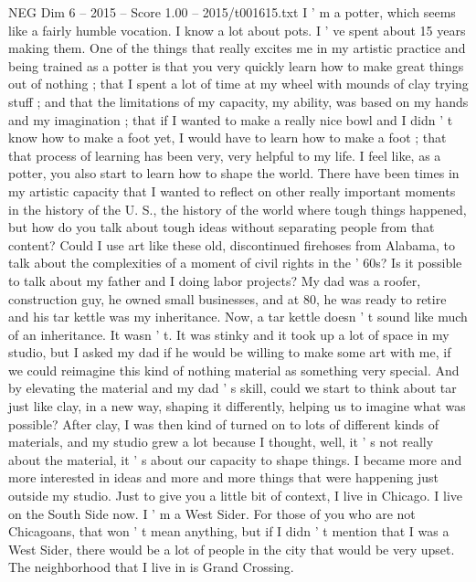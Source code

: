 \begin{textsample}{NEG Dim 6 – 2015 – Score 1.00 – 2015/t001615.txt}  \label{ex:f6_neg_029}
I ' m a potter, which seems like a fairly humble vocation.
I know a lot about pots.
I ' ve spent about 15 years making them.
One of the things that really excites me in my artistic practice and being trained as a potter is that you very quickly learn how to make great things out of nothing ; that I spent a lot of time at my wheel with mounds of clay trying stuff ; and that the limitations of my capacity, my ability, was based on my hands and my imagination ; that if I wanted to make a really nice bowl and I didn ' t know how to make a foot yet, I would have to learn how to make a foot ; that that process of learning has been very, very helpful to my life.
I feel like, as a potter, you also start to learn how to shape the world.
There have been times in my artistic capacity that I wanted to reflect on other really important moments in the history of the U.
S., the history of the world where tough things happened, but how do you talk about tough ideas without separating people from that content?
Could I use art like these old, discontinued firehoses from Alabama, to talk about the complexities of a moment of civil rights in the ' 60s?
Is it possible to talk about my father and I doing labor projects?
My dad was a roofer, construction guy, he owned small businesses, and at 80, he was ready to retire and his tar kettle was my inheritance.
Now, a tar kettle doesn ' t sound like much of an inheritance.
It wasn ' t.
It was stinky and it took up a lot of space in my studio, but I asked my dad if he would be willing to make some art with me, if we could reimagine this kind of nothing material as something very special.
And by elevating the material and my dad ' s skill, could we start to think about tar just like clay, in a new way, shaping it differently, helping us to imagine what was possible?
After clay, I was then kind of turned on to lots of different kinds of materials, and my studio grew a lot because I thought, well, it ' s not really about the material, it ' s about our capacity to shape things.
I became more and more interested in ideas and more and more things that were happening just outside my studio.
Just to give you a little bit of context, I live in Chicago.
I live on the South Side now.
I ' m a West Sider.
For those of you who are not Chicagoans, that won ' t mean anything, but if I didn ' t mention that I was a West Sider, there would be a lot of people in the city that would be very upset.
The neighborhood that I live in is Grand Crossing.

\end{textsample}
